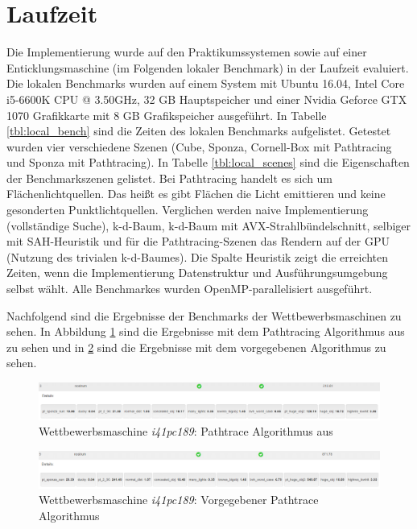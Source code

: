 \section{Laufzeit}
Die Implementierung wurde auf den Praktikumssystemen sowie auf einer Enticklungsmaschine (im Folgenden \glqq lokaler Benchmark\grqq) in der Laufzeit evaluiert. Die lokalen Benchmarks wurden auf einem System mit Ubuntu 16.04, Intel Core i5-6600K CPU @ 3.50GHz, 32 GB Hauptspeicher und einer Nvidia Geforce GTX 1070 Grafikkarte mit 8 GB Grafikspeicher ausgeführt.  In Tabelle \ref{tbl:local_bench} sind die Zeiten des lokalen Benchmarks aufgelistet. Getestet wurden vier verschiedene Szenen (Cube, Sponza, Cornell-Box mit Pathtracing und Sponza mit Pathtracing). In Tabelle \ref{tbl:local_scenes} sind die Eigenschaften der Benchmarkszenen gelistet. Bei Pathtracing handelt es sich um Flächenlichtquellen. Das heißt es gibt Flächen die Licht emittieren und keine gesonderten Punktlichtquellen. Verglichen werden naive Implementierung (vollständige Suche), k-d-Baum, k-d-Baum mit AVX-Strahlbündelschnitt, selbiger mit SAH-Heuristik und für die Pathtracing-Szenen das Rendern auf der GPU (Nutzung des trivialen k-d-Baumes). Die Spalte Heuristik zeigt die erreichten Zeiten, wenn die Implementierung Datenstruktur und Ausführungsumgebung selbst wählt. Alle Benchmarkes wurden OpenMP-parallelisiert ausgeführt.

Nachfolgend sind die Ergebnisse der Benchmarks der Wettbewerbsmaschinen zu sehen. In Abbildung \ref{img:ptnormal} sind die Ergebnisse mit dem Pathtracing Algorithmus aus \cite{Kajiya:1986:RE:15886.15902} zu sehen und in \ref{img:ptdiffuse} sind die Ergebnisse mit dem vorgegebenen Algorithmus zu sehen.

\begin{figure}[htbp]
	\centering
	\includegraphics[width=1\textwidth]{graphics/nostrum_benches_avx_nogpu_ptnormal.PNG}
	\caption{Wettbewerbsmaschine \textit{i41pc189}: Pathtrace Algorithmus aus \cite{Kajiya:1986:RE:15886.15902}}
	\label{img:ptnormal}
\end{figure}

\begin{figure}[htbp]
	\centering
	\includegraphics[width=1\textwidth]{graphics/nostrum_benches_avx_nogpu_ptdiffuse.PNG}
	\caption{Wettbewerbsmaschine \textit{i41pc189}: Vorgegebener Pathtrace Algorithmus}
	\label{img:ptdiffuse}
\end{figure}
